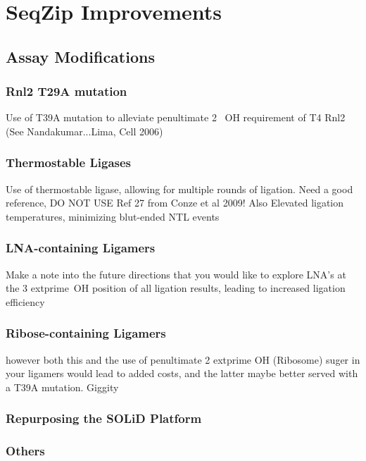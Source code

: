 \section{SeqZip Improvements}

  \subsection{Assay Modifications}

    \subsubsection{Rnl2 T29A mutation}

    Use of T39A mutation to alleviate penultimate 2\textprime~ OH requirement of T4 Rnl2 (See Nandakumar...Lima, Cell 2006)

    \subsubsection{Thermostable Ligases}

    Use of thermostable ligase, allowing for multiple rounds of ligation. Need a good reference, DO NOT USE Ref 27 from Conze et al 2009! Also Elevated ligation temperatures, minimizing blut-ended NTL events

    \subsubsection{LNA-containing Ligamers}

    Make a note into the future directions that you would like to explore LNA’s at the 3  extprime~OH position of all ligation results, leading to increased ligation efficiency

    \subsubsection{Ribose-containing Ligamers}

    however both this and the use of penultimate 2  extprime OH (Ribosome) suger in your ligamers would lead to added costs, and the latter maybe better served with a T39A mutation. Giggity

    \subsubsection{Repurposing the SOLiD Platform}

    \subsubsection{Others}

